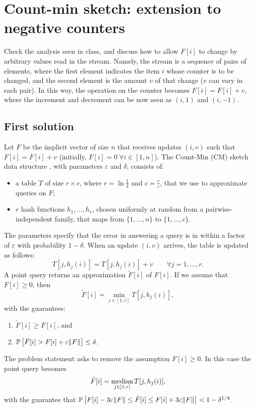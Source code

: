 \section{Count-min sketch: extension to negative counters}

Check the analysis seen in class, and discuss how to allow $F[i]$ to change by arbitrary
values read in the stream.
Namely, the stream is a sequence of pairs of elements, where the first element indicates the
item $i$ whose counter is to be changed, and the second element is the amount $v$ of that
change ($v$ can vary in each pair).
In this way, the operation on the counter becomes $F[i] = F[i] + v$, where the increment
and decrement can be now seen as $(i, 1)$ and $(i, -1)$.


\subsection{First solution}

Let $F$ be the implicit vector of size $n$ that receives updates $(i, v)$ such that $F[i]=F[i]+v$ (initially, $F[i]=0 \; \forall i \in [1, n]$).
The Count-Min (CM) sketch data structure \cite{Cormode05}, with parameters $\varepsilon$ and $\delta$, consists of:
\begin{itemize}
  \item a table $T$ of size $r\times c$, where $r=\ln\frac{1}{\delta}$ and $c=\frac{e}{\varepsilon}$, that we use to approximate queries on $F$;
  \item $r$ hash functions $h_1, \dots, h_r$, chosen uniformly at random from a pairwise-independent family, that maps from $\{1,\dots,n\}$ to $\{1,\dots,c\}$.
\end{itemize}
The parameters specify that the error in answering a query is in within a factor of $\varepsilon$ with probability $1-\delta$.
When an update $(i, v)$ arrives, the table is updated as follows: 
$$ T[j, h_j(i)] = T[j, h_j(i)] + v \qquad \forall j = 1, \dots, r. $$ 
A point query returns an approximation $\tilde{F}[i]$ of $F[i]$. If we assume that $F[i] \geq 0$, then
$$\tilde{F}[i]=\min_{j\in[1,r]} T[j, h_j(i)],$$ with the guarantees:
\begin{enumerate}
  \item $\tilde{F}[i]\geq F[i]$, and
  \item $\operatorname*{\mathbb{P}}\left[{\tilde{F}[i]>F[i]+\varepsilon\lVert F\rVert}\right]\le\delta$.
\end{enumerate}

The problem statement asks to remove the assumption $F[i]\geq 0$. In this case the point query becomes 
$$\tilde{F}[i]=\operatorname*{median}_{j\in[1,r]} T[j, h_j(i)],$$
with the guarantee that $\operatorname*{\mathbb{P}}\left[{F[i]-3\varepsilon\lVert F\rVert \leq \tilde{F}[i] \leq F[i]+3\varepsilon\lVert F\rVert}\right] < 1-\delta^{1/4}$.

